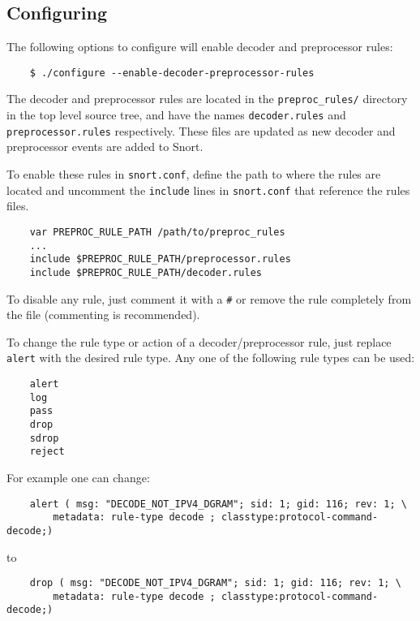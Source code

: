 \documentclass[english]{report}
\begin{document}
\subsection{Configuring}

The following options to configure will enable decoder and preprocessor rules:

\begin{verbatim}
    $ ./configure --enable-decoder-preprocessor-rules
\end{verbatim}

The decoder and preprocessor rules are located in the \texttt{preproc\_rules/}
directory in the top level source tree, and have the names
\texttt{decoder.rules} and \texttt{preprocessor.rules} respectively.  These
files are updated as new decoder and preprocessor events are added to Snort.

To enable these rules in \texttt{snort.conf}, define the path to where the
rules are located and uncomment the \texttt{include} lines in
\texttt{snort.conf} that reference the rules files.

\begin{verbatim}
    var PREPROC_RULE_PATH /path/to/preproc_rules
    ...
    include $PREPROC_RULE_PATH/preprocessor.rules
    include $PREPROC_RULE_PATH/decoder.rules
\end{verbatim}

To disable any rule, just comment it with a \texttt{\#} or remove the rule
completely from the file (commenting is recommended).

To change the rule type or action of a decoder/preprocessor rule, just replace
\texttt{alert} with the desired rule type.  Any one of the following rule types
can be used:

\begin{verbatim}
    alert
    log
    pass
    drop
    sdrop
    reject
\end{verbatim}

For example one can change:

\begin{verbatim}
    alert ( msg: "DECODE_NOT_IPV4_DGRAM"; sid: 1; gid: 116; rev: 1; \
        metadata: rule-type decode ; classtype:protocol-command-decode;)
\end{verbatim}

to

\begin{verbatim}
    drop ( msg: "DECODE_NOT_IPV4_DGRAM"; sid: 1; gid: 116; rev: 1; \
        metadata: rule-type decode ; classtype:protocol-command-decode;)
\end{verbatim}
\end{document}
